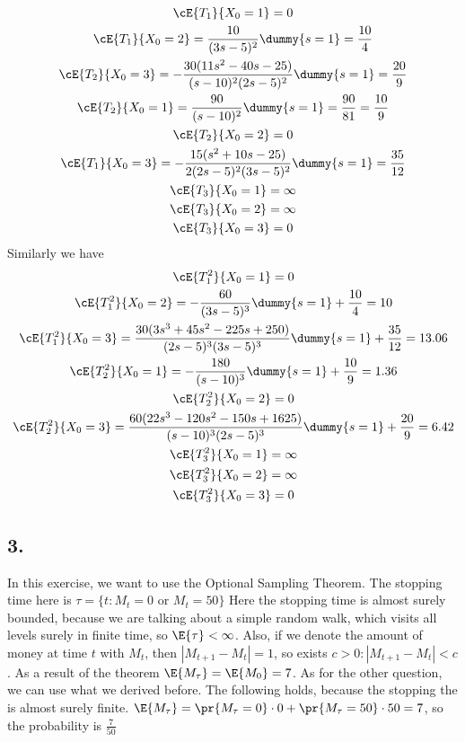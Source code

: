 \begin{gather*}
    \cE{T_{1}}{X_0=1} = 0 \\
    \cE{T_{1}}{X_0=2} =  \frac{10}{(3s-5)^2}\dummy{s=1}=\frac{10}{4}\\
    \cE{T_{2}}{X_0=3}  = -\frac{30(11s^2-40s-25)}{(s-10)^2(2s-5)^2}\dummy{s=1}=\frac{20}{9}\\
    \cE{T_{2}}{X_0=1} = \frac{90}{(s-10)^2}\dummy{s=1} =  \frac{90}{81}=\frac{10}{9}\\
    \cE{T_{2}}{X_0=2}  = 0\\
    \cE{T_{1}}{X_0=3}  = -\frac{15(s^2+10s-25)}{2(2s-5)^2(3s-5)^2}\dummy{s=1}= \frac{35}{12}\\
    \cE{T_{3}}{X_0=1} = \infty\\
    \cE{T_{3}}{X_0=2} = \infty\\
    \cE{T_{3}}{X_0=3} = 0 \\
\end{gather*}
Similarly we have
\begin{gather*}
    \cE{T_{1}^2}{X_0=1} = 0\\
    \cE{T_{1}^2}{X_0=2}  =  -\frac{60}{(3s-5)^3}\dummy{s=1}+\frac{10}{4}= 10\\
    \cE{T_{1}^2}{X_0=3} = \frac{30(3s^3+45s^2-225s+250)}{(2s-5)^3(3s-5)^3}\dummy{s=1} + \frac{35}{12} = 13.06\\
    \cE{T_{2}^2}{X_0=1}  = -\frac{180}{(s-10)^3}\dummy{s=1}+\frac{10}{9}=1.36\\
    \cE{T_{2}^2}{X_0=2}  = 0\\ 
    \cE{T_{2}^2}{X_0=3} =\frac{60(22s^3-120s^2-150s+1625)}{(s-10)^3(2s-5)^3}\dummy{s=1}+\frac{20}{9}=6.42\\
    \cE{T_{3}^2}{X_0=1} = \infty\\
    \cE{T_{3}^2}{X_0=2} = \infty\\
    \cE{T_{3}^2}{X_0=3}  = 0\\
\end{gather*}


\subsection*{3.}
In this exercise, we want to use the Optional Sampling Theorem. The stopping time here is $\tau = \{t : M_t = 0 \text{ or } M_t =50\}$
Here the stopping time is almost surely bounded, because we are talking about a simple random walk, which visits all levels surely in finite time, so $\E{\tau} <\infty$. Also, if we denote the amount of money at time $t$ with $M_t$, then $|M_{t+1}- M_t| = 1 $, so exists $c>0: |M_{t+1}- M_t|<c$. As a result of the theorem $\E{M_\tau} = \E{M_0} = 7$. As for the other question, we can use what we derived before. The following holds, because the stopping the is almost surely finite. $\E{M_\tau} = \pr{M_\tau = 0} \cdot 0+ \pr{M_\tau = 50} \cdot 50 = 7 $, so the probability is $\frac{7}{50}$
